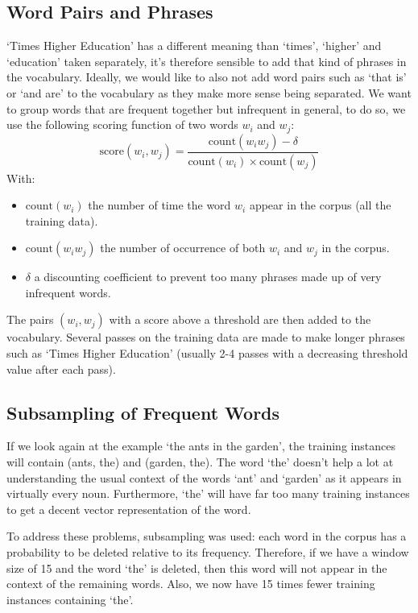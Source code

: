 \subsection{Word Pairs and Phrases}
`Times Higher Education' has a different meaning than `times', `higher' and `education' taken separately, it's therefore sensible to add that kind of phrases in the vocabulary. Ideally, we would like to also not add word pairs such as `that is' or `and are' to the vocabulary as they make more sense being separated. We want to group words that are frequent together but infrequent in general, to do so, we use the following scoring function of two words $w_i$ and $w_j$:
\begin{equation}
    \text{score}(w_i, w_j) = \frac{\text{count}(w_iw_j) - \delta}{\text{count}(w_i)\times \text{count}(w_j)}
\end{equation}
With: 
\begin{itemize}[topsep=0pt]
    \item $\text{count}(w_i)$ the number of time the word $w_i$ appear in the corpus (all the training data).
    \item $\text{count}(w_iw_j)$ the number of occurrence of both $w_i$ and $w_j$ in the corpus. 
    \item $\delta$ a discounting coefficient to prevent too many phrases made up of very infrequent words.
\end{itemize}

The pairs $(w_i, w_j)$ with a score above a threshold are then added to the vocabulary. Several passes on the training data are made to make longer phrases such as `Times Higher Education' (usually 2-4 passes with a decreasing threshold value after each pass).

\subsection{Subsampling of Frequent Words}
If we look again at the example `the ants in the garden', the training instances will contain (ants, the) and (garden, the). The word `the' doesn't help a lot at understanding the usual context of the words `ant' and `garden' as it appears in virtually every noun. Furthermore, `the' will have far too many training instances to get a decent vector representation of the word.

To address these problems, subsampling was used: each word in the corpus has a probability to be deleted relative to its frequency. Therefore, if we have a window size of 15 and the word `the' is deleted, then this word will not appear in the context of the remaining words. Also, we now have 15 times fewer training instances containing `the'.

